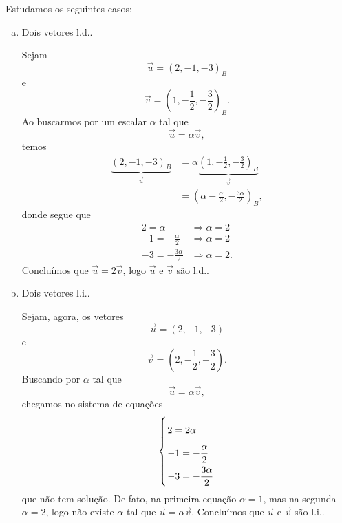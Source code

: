 \begin{ex}
  Estudamos os seguintes casos:
  \begin{enumerate}[a)]
  \item Dois vetores l.d..
  
    Sejam
    \begin{equation}
      \vec{u} = (2,-1,-3)_B
    \end{equation}
    e 
    \begin{equation}
      \vec{v} = \left(1,-\frac{1}{2},-\frac{3}{2}\right)_B.
    \end{equation}
    Ao buscarmos por um escalar $\alpha$ tal que
    \begin{equation}
      \vec{u} = \alpha\vec{v},
    \end{equation}
    temos
    \begin{align}
      \underbrace{(2, -1, -3)_B}_{\vec{u}} &= \alpha\underbrace{\left(1, -\frac{1}{2}, -\frac{3}{2}\right)_B}_{\vec{v}}\\
                        &= \left(\alpha -\frac{\alpha}{2}, -\frac{3\alpha}{2}\right)_B,
    \end{align}
    donde segue que 
    \begin{align}
      2 = \alpha &\Rightarrow \alpha = 2\\
      -1 = -\frac{\alpha}{2} &\Rightarrow \alpha = 2\\
      -3 = -\frac{3\alpha}{2} &\Rightarrow \alpha = 2.
    \end{align}
    Concluímos que $\vec{u} = 2\vec{v}$, logo $\vec{u}$ e $\vec{v}$ são l.d..

  \item Dois vetores l.i..
  
  Sejam, agora, os vetores
  \begin{equation}
    \vec{u} = (2,-1,-3)
  \end{equation}
  e 
  \begin{equation}
    \vec{v} = \left(2,-\frac{1}{2},-\frac{3}{2}\right).
  \end{equation}
  Buscando por $\alpha$ tal que
  \begin{equation}
    \vec{u} = \alpha\vec{v},
  \end{equation}
  chegamos no sistema de equações
  \begin{equation}
    \left\{\arraycolsep=1pt\def\arraystretch{2.}
    \begin{array}{l}
      \displaystyle 2 = 2\alpha\\
      \displaystyle -1 = -\frac{\alpha}{2}\\
      \displaystyle -3 = -\frac{3\alpha}{2}
    \end{array}\right.
  \end{equation}
  que não tem solução. De fato, na primeira equação $\alpha = 1$, mas na segunda $\alpha = 2$, logo não existe $\alpha$ tal que
  $\vec{u} = \alpha\vec{v}$. Concluímos que $\vec{u}$ e $\vec{v}$ são l.i..
  \end{enumerate}

\end{ex}

